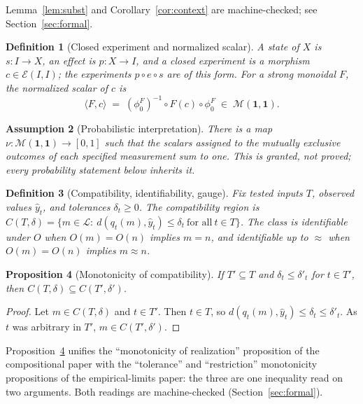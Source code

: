 \documentclass[11pt]{article}
\newtheorem{definition}{Definition}[section]
\newtheorem{assumption}[definition]{Assumption}
\newtheorem{proposition}[definition]{Proposition}
\theoremstyle{definition}
\begin{document}
Lemma~\ref{lem:subst} and Corollary~\ref{cor:context} are machine-checked; see
Section~\ref{sec:formal}.

\begin{definition}[Closed experiment and normalized scalar]
\label{def:scalar}
A \emph{state} of $X$ is $s:I\to X$, an \emph{effect} is $p:X\to I$, and a
\emph{closed experiment} is a morphism $c\in\mathcal E(I,I)$; the experiments
$p\circ e\circ s$ are of this form. For a strong monoidal $F$, the
\emph{normalized scalar} of $c$ is
\[
\langle F,c\rangle \;=\; (\phi_0^F)^{-1}\circ F(c)\circ\phi_0^F
\;\in\;\mathcal M(\mathbf 1,\mathbf 1).
\]
\end{definition}

\begin{assumption}[Probabilistic interpretation]
\label{ass:prob}
There is a map $\nu:\mathcal M(\mathbf 1,\mathbf 1)\to[0,1]$ such that the
scalars assigned to the mutually exclusive outcomes of each specified
measurement sum to one. This is granted, not proved; every probability
statement below inherits it.
\end{assumption}

\begin{definition}[Compatibility, identifiability, gauge]
\label{def:compat}
Fix tested inputs $T$, observed values $\widehat y_t$, and tolerances
$\delta_t\ge0$. The \emph{compatibility region} is
$C(T,\delta)=\{m\in\mathcal L:\ d(q_t(m),\widehat y_t)\le\delta_t\ \text{for all}\ t\in T\}$.
The class is \emph{identifiable} under $O$ when $O(m)=O(n)$ implies $m=n$, and
\emph{identifiable up to} $\approx$ when $O(m)=O(n)$ implies $m\approx n$.
\end{definition}

\begin{proposition}[Monotonicity of compatibility]
\label{prop:mono}
If $T'\subseteq T$ and $\delta_t\le\delta'_t$ for $t\in T'$, then
$C(T,\delta)\subseteq C(T',\delta')$.
\end{proposition}
\begin{proof}
Let $m\in C(T,\delta)$ and $t\in T'$. Then $t\in T$, so
$d(q_t(m),\widehat y_t)\le\delta_t\le\delta'_t$. As $t$ was arbitrary in $T'$,
$m\in C(T',\delta')$.
\end{proof}

Proposition~\ref{prop:mono} unifies the ``monotonicity of realization''
proposition of the compositional paper with the ``tolerance'' and
``restriction'' monotonicity propositions of the empirical-limits paper: the
three are one inequality read on two arguments. Both readings are
machine-checked (Section~\ref{sec:formal}).
\end{document}
